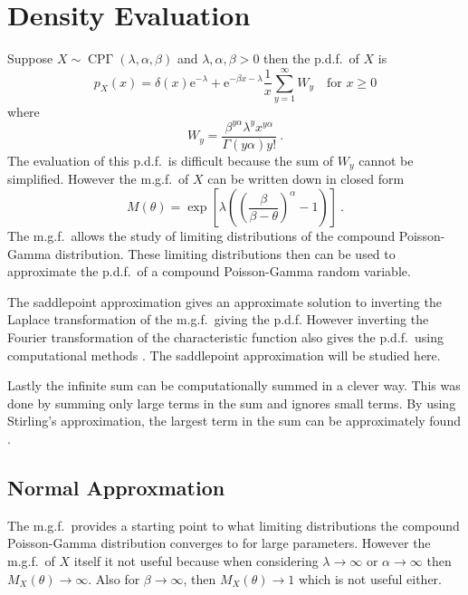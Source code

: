 \documentclass[12pt, a4paper]{memoir}
\DeclareMathOperator{\CPoisson}{CP\Gamma}
\newcommand{\euler}{\mathrm{e}}
\begin{document}
\section{Density Evaluation}
Suppose $X\sim\CPoisson(\lambda,\alpha,\beta)$ and $\lambda,\alpha,\beta>0$ then the p.d.f.~of $X$ is
\begin{equation}
p_X(x) = 
\delta(x) \euler^{-\lambda}
+
\euler^{-\beta x-\lambda}\frac{1}{x}\sum_{y=1}^{\infty}W_y
\quad\text{for }x\geqslant 0
\end{equation}
where
\begin{equation}
W_y = \frac{\beta^{y\alpha}\lambda^yx^{y\alpha}}{\Gamma(y\alpha)y!} \ .
\end{equation}
The evaluation of this p.d.f.~is difficult because the sum of $W_y$ cannot be simplified. However the m.g.f.~of $X$ can be written down in closed form
\begin{equation}
M(\theta)=\exp\left[\lambda\left(\left(\frac{\beta}{\beta-\theta}\right)^{\alpha}-1\right)\right] \ .
\end{equation}
The m.g.f.~allows the study of limiting distributions of the compound Poisson-Gamma distribution. These limiting distributions then can be used to approximate the p.d.f.~of a compound Poisson-Gamma random variable.

The saddlepoint approximation \citep{daniels1954saddlepoint} gives an approximate solution to inverting the Laplace transformation  of the m.g.f.~giving the p.d.f. However inverting the Fourier transformation of the characteristic function also gives the p.d.f.~using computational methods \citep{dunn2008evaluation}. The saddlepoint approximation will be studied here.

Lastly the infinite sum can be computationally summed in a clever way. This was done by summing only large terms in the sum and ignores small terms. By using Stirling's approximation, the largest term in the sum can be approximately found \citep{dunn2005series}.

\subsection{Normal Approxmation}
The m.g.f.~provides a starting point to what limiting distributions the compound Poisson-Gamma distribution converges to for large parameters. However the m.g.f.~of $X$ itself it not useful because when considering $\lambda\rightarrow\infty$ or $\alpha\rightarrow\infty$ then $M_X(\theta)\rightarrow\infty$. Also for $\beta\rightarrow\infty$, then $M_X(\theta)\rightarrow 1$ which is not useful either.
\end{document}
